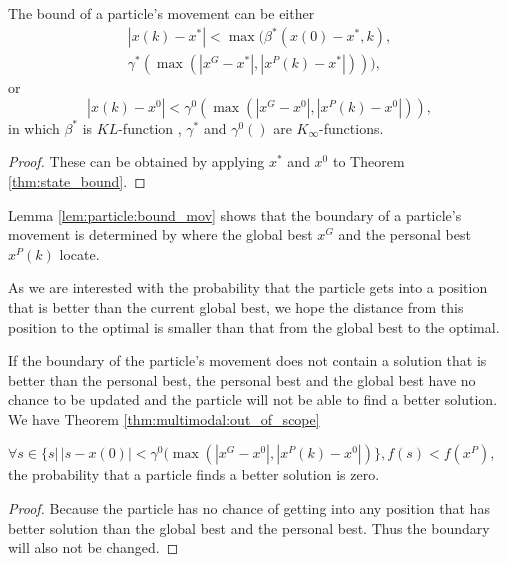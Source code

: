 \begin{mylem}
\label{lem:particle:bound_mov}
The bound of a particle's movement can be either 
\begin{equation}
\begin{aligned}
| x(k) - x^{*} | < \max ( \beta^{*} ( x(0) - x^{*}, k ), \\ \gamma^{*} ( \max ( | x^{G} - x^{*} | , | x^{P}(k) - x^{*}  | ) ) ),
\end{aligned}
\end{equation}
or 
\begin{equation}
| x(k) - x^{0} | < \gamma^{0} ( \max ( | x^{G} - x^{0} | , | x^{P}(k) - x^{0}  | ) ),
\end{equation}
in which $ \beta^{*} $ is $ KL $-function , $ \gamma^{*}  $ and $ \gamma^{0} () $ are $ K_{\infty} $-functions.
\begin{proof}
These can be obtained by applying $ x^{*} $ and $ x^{0} $ to Theorem \ref{thm:state_bound}.
\end{proof}
\end{mylem}
Lemma \ref{lem:particle:bound_mov} shows that the boundary of a particle's movement is determined by where the global best $ x^{G} $ and the personal best $ x^{P}(k) $ locate.

As we are interested with the probability that the particle gets into a position that is better than the current global best, we hope the distance from this position to the optimal is smaller than that from the global best to the optimal.

If the boundary of the particle's movement does not contain a solution that is better than the personal best, the personal best and the global best have no chance to be updated and the particle will not be able to find a better solution.
We have Theorem \ref{thm:multimodal:out_of_scope}
\begin{mythm}
\label{thm:multimodal:out_of_scope}
$ \forall s \in \{ s | \, |s - x(0)| < \gamma^{0} ( \max ( | x^{G} - x^{0} | , | x^{P}(k) - x^{0}  | ) \}, f(s) < f(x^{P})  $, the probability that a particle finds a better solution is zero.
\begin{proof}
Because the particle has no chance of getting into any position that has better solution than the global best and the personal best.
Thus the boundary will also not be changed.
\end{proof}
\end{mythm}

